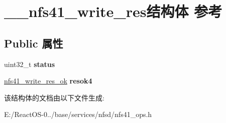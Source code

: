 \hypertarget{struct____nfs41__write__res}{}\section{\+\_\+\+\_\+nfs41\+\_\+write\+\_\+res结构体 参考}
\label{struct____nfs41__write__res}
\subsection*{Public 属性}
\begin{DoxyCompactItemize}
\item 
\mbox{\label{struct____nfs41__write__res_a2c2e20a8d2395a2ba9fbffc8b9470a70}} 
uint32\+\_\+t {\bfseries status}
\item 
\mbox{\label{struct____nfs41__write__res_ae28d24cb6d393d0106d9ec26aee2a64d}} 
\hyperlink{struct____nfs41__write__res__ok}{nfs41\+\_\+write\+\_\+res\+\_\+ok} {\bfseries resok4}
\end{DoxyCompactItemize}


该结构体的文档由以下文件生成\+:\begin{DoxyCompactItemize}
\item 
E\+:/\+React\+O\+S-\/0../base/services/nfsd/nfs41\+\_\+ops.\+h\end{DoxyCompactItemize}
